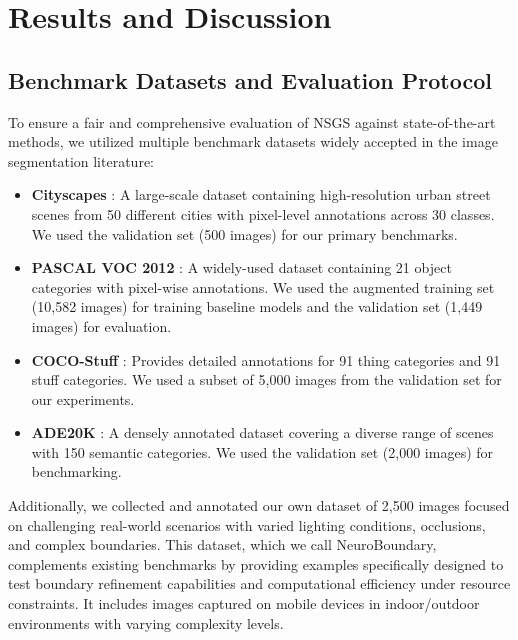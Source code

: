 \documentclass[conference]{IEEEtran}
\begin{document}
\section{Results and Discussion} \label{sec:results}

\subsection{Benchmark Datasets and Evaluation Protocol}
To ensure a fair and comprehensive evaluation of NSGS against state-of-the-art methods, we utilized multiple benchmark datasets widely accepted in the image segmentation literature:

\begin{itemize}
    \item \textbf{Cityscapes} \cite{Cordts2016}: A large-scale dataset containing high-resolution urban street scenes from 50 different cities with pixel-level annotations across 30 classes. We used the validation set (500 images) for our primary benchmarks.
    
    \item \textbf{PASCAL VOC 2012} \cite{Everingham2015}: A widely-used dataset containing 21 object categories with pixel-wise annotations. We used the augmented training set (10,582 images) for training baseline models and the validation set (1,449 images) for evaluation.
    
    \item \textbf{COCO-Stuff} \cite{Caesar2018}: Provides detailed annotations for 91 thing categories and 91 stuff categories. We used a subset of 5,000 images from the validation set for our experiments.
    
    \item \textbf{ADE20K} \cite{Zhou2019}: A densely annotated dataset covering a diverse range of scenes with 150 semantic categories. We used the validation set (2,000 images) for benchmarking.
\end{itemize}

Additionally, we collected and annotated our own dataset of 2,500 images focused on challenging real-world scenarios with varied lighting conditions, occlusions, and complex boundaries. This dataset, which we call NeuroBoundary, complements existing benchmarks by providing examples specifically designed to test boundary refinement capabilities and computational efficiency under resource constraints. It includes images captured on mobile devices in indoor/outdoor environments with varying complexity levels.
\end{document}
